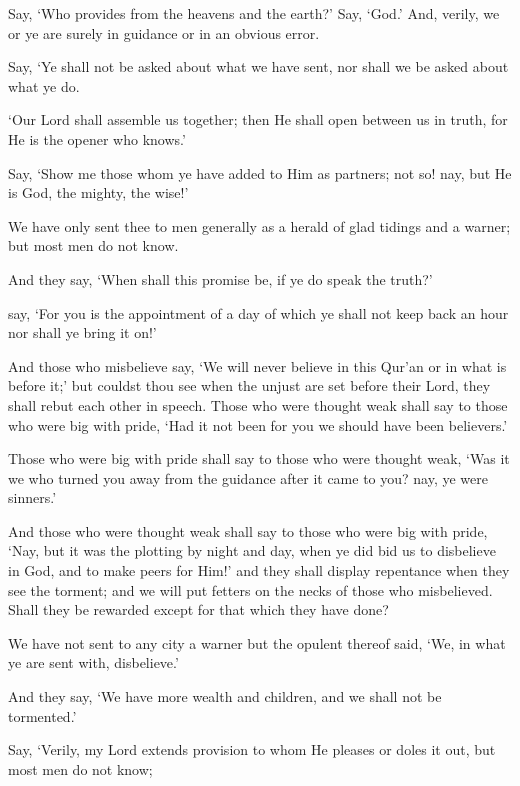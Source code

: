 \documentclass[fontsize=14pt, letterpaper, notitlepage, openany, DIV=12]{scrbook} %
\begin{document}
\noindent[34:24]
Say, `Who provides from the heavens and the earth?' Say, `God.' And, verily, we or ye
are surely in guidance or in an obvious error.

\noindent[34:25]
Say, `Ye shall not be asked about what we have sent, nor shall we be asked about what ye
do.

\noindent[34:26]
`Our Lord shall assemble us together; then He shall open between us in truth, for He is
the opener who knows.'

\noindent[34:27]
Say, `Show me those whom ye have added to Him as partners; not so! nay, but He is
God, the mighty, the wise!'

\noindent[34:28]
We have only sent thee to men generally as a herald of glad tidings and a warner; but
most men do not know.

\noindent[34:29]
And they say, `When shall this promise be, if ye do speak the truth?'

\noindent[34:30]
say, `For you is the appointment of a day of which ye shall not keep back an hour nor
shall ye bring it on!'

\noindent[34:31]
And those who misbelieve say, `We will never believe in this Qur'an or in what is before
it;' but couldst thou see when the unjust are set before their Lord, they shall rebut each other in
speech. Those who were thought weak shall say to those who were big with pride, `Had it not
been for you we should have been believers.'

\noindent[34:32]
Those who were big with pride shall say to those who were thought weak, `Was it we
who turned you away from the guidance after it came to you? nay, ye were sinners.'

\noindent[34:33]
And those who were thought weak shall say to those who were big with pride, `Nay, but
it was the plotting by night and day, when ye did bid us to disbelieve in God, and to make peers
for Him!' and they shall display repentance when they see the torment; and we will put fetters on
the necks of those who misbelieved. Shall they be rewarded except for that which they have
done?

\noindent[34:34]
We have not sent to any city a warner but the opulent thereof said, `We, in what ye are
sent with, disbelieve.'

\noindent[34:35]
And they say, `We have more wealth and children, and we shall not be tormented.'

\noindent[34:36]
Say, `Verily, my Lord extends provision to whom He pleases or doles it out, but most
men do not know;
\end{document}
